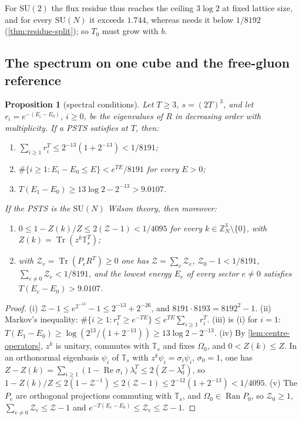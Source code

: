 \documentclass[11pt,a4paper]{amsart}
\newtheorem{proposition}[theorem]{Proposition}
\theoremstyle{definition}
\theoremstyle{remark}
\numberwithin{equation}{section}
\DeclareMathOperator{\Tr}{Tr}        %
\newcommand{\Z}{\mathbb{Z}}          %
\newcommand{\SU}{\mathrm{SU}}              %
\newcommand{\PSTS}{\textup{PSTS}}          %
\newcommand{\TT}{\mathbb{T}}               %
\newcommand{\Zc}{\mathcal{Z}}              %
\newcommand{\cube}[1]{(2#1)^3}             %
\newcommand{\lzero}{\lambda_0}             %
\newcommand{\Omegazero}{\Omega_0}          %
\newcommand{\xconst}{\frac{1}{8192}}       %
\newcommand{\xconstinl}{1/8192}            %
\newcommand{\Mcirc}{\text{\upshape(M$^{\circ}$)}}   %
\newcommand{\Bcirc}{\text{\upshape(B$^{\circ}$)}}   %
\begin{document}
For $\SU(2)$ the flux residue thus reaches the ceiling $3\log2$ at fixed lattice size, and for every $\SU(N)$ it exceeds $1.744$, whereas \Mcirc{} needs it below $\xconstinl$ (\cref{thm:residue-split}); so $T_0$ must grow with $b$.

\subsection{The spectrum on one cube and the free-gluon reference}

\begin{proposition}[spectral conditions]\label{prop:spectral-conditions}
Let $T\ge3$, $s=\cube T$, and let $r_i=e^{-(E_i-E_0)}$, $i\ge0$, be the eigenvalues of $R$ in decreasing order with multiplicity. If a \PSTS{} satisfies \Bcirc{} at $T$, then:
\begin{enumerate}[label=\textup{(\roman*)},leftmargin=*]
\item $\sum_{i\ge1}r_i^T\le2^{-13}(1+2^{-13})<1/8191$;
\item $\#\{i\ge1:E_i-E_0\le E\}<e^{TE}/8191$ for every $E>0$;
\item $T(E_1-E_0)\ge13\log2-2^{-13}>9.0107$.
\end{enumerate}
If the \PSTS{} is the $\SU(N)$ Wilson theory, then moreover:
\begin{enumerate}[label=\textup{(\roman*)},leftmargin=*,resume]
\item $0\le1-Z(k)/Z\le2(\Zc-1)<1/4095$ for every $k\in\Z_N^3\setminus\{0\}$, with $Z(k)=\Tr(z^k\TT_s^T)$;
\item with $\Zc_e=\Tr(P_eR^T)\ge0$ one has $\Zc=\sum_e\Zc_e$, $\Zc_0-1<1/8191$, $\sum_{e\ne0}\Zc_e<1/8191$, and the lowest energy $E_e$ of every sector $e\ne0$ satisfies $T(E_e-E_0)>9.0107$.
\end{enumerate}
\end{proposition}

\begin{proof}
(i) $\Zc-1\le e^{2^{-13}}-1\le2^{-13}+2^{-26}$, and $8191\cdot8193=8192^2-1$. (ii) Markov's inequality: $\#\{i\ge1:r_i^T\ge e^{-TE}\}\le e^{TE}\sum_{i\ge1}r_i^T$. (iii) is (i) for $i=1$: $T(E_1-E_0)\ge\log(2^{13}/(1+2^{-13}))\ge13\log2-2^{-13}$. (iv) By \cref{lem:centre-operators}, $z^k$ is unitary, commutes with $\TT_s$ and fixes $\Omegazero$, and $0<Z(k)\le Z$. In an orthonormal eigenbasis $\psi_i$ of $\TT_s$ with $z^k\psi_i=\sigma_i\psi_i$, $\sigma_0=1$, one has $Z-Z(k)=\sum_{i\ge1}(1-\operatorname{Re}\sigma_i)\lambda_i^T\le2(Z-\lzero^T)$, so $1-Z(k)/Z\le2(1-\Zc^{-1})\le2(\Zc-1)\le2^{-12}(1+2^{-13})<1/4095$. (v) The $P_e$ are orthogonal projections commuting with $\TT_s$, and $\Omegazero\in\operatorname{Ran}P_0$, so $\Zc_0\ge1$, $\sum_{e\ne0}\Zc_e\le\Zc-1$ and $e^{-T(E_e-E_0)}\le\Zc_e\le\Zc-1$.
\end{proof}
\end{document}

